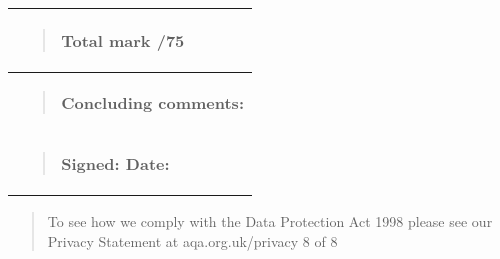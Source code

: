 \documentclass[
]{article}
\begin{document}
\begin{longtable}[]{@{}l@{}}
\toprule
\begin{minipage}[b]{0.97\columnwidth}\raggedright
\begin{quote}
\textbf{Total mark /75}
\end{quote}\strut
\end{minipage}\tabularnewline
\midrule
\endhead
\begin{minipage}[t]{0.97\columnwidth}\raggedright
\begin{quote}
\textbf{Concluding comments:}
\end{quote}\strut
\end{minipage}\tabularnewline
\begin{minipage}[t]{0.97\columnwidth}\raggedright
\begin{quote}
\textbf{Signed: Date:}
\end{quote}\strut
\end{minipage}\tabularnewline
\bottomrule
\end{longtable}

\begin{quote}
To see how we comply with the Data Protection Act 1998 please see our
Privacy Statement at aqa.org.uk/privacy 8 of 8
\end{quote}
\end{document}
